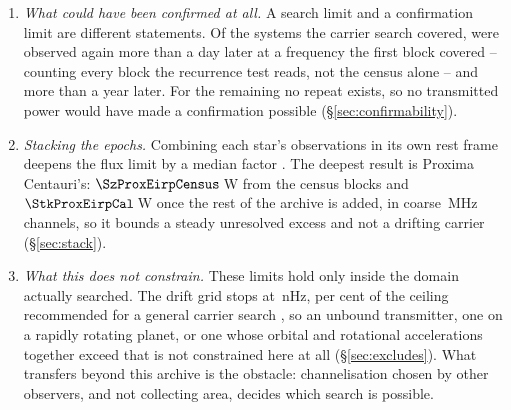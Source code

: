 \begin{enumerate}[leftmargin=1.6em,itemsep=4pt,topsep=4pt,parsep=0pt]
\item \emph{What could have been confirmed at all.} A search limit and a
confirmation limit are different statements. Of the \NSysClassA{} systems the
carrier search covered, \ZcConfSysDay{} were observed again more than a day later
at a frequency the first block covered -- counting every
block the recurrence test reads, not the census alone -- and \ZcConfSysYr{}
more than a year later. For the remaining \ZcNoRepSys{} no repeat exists, so
no transmitted power would have made a confirmation possible
(\S\ref{sec:confirmability}).

\item \emph{Stacking the epochs.} Combining each star's observations in its
own rest frame deepens the flux limit by a median factor \SyStkGainMed. The
deepest result is Proxima Centauri's: $\SzProxEirpCensus$\,W from the census
blocks and $\StkProxEirpCal$\,W once the rest of the archive is added, in
coarse \ChanBModeMHz\,MHz channels, so it bounds a steady unresolved excess
and not a drifting carrier (\S\ref{sec:stack}).

\item \emph{What this does not constrain.} These limits hold only inside the
domain actually searched. The drift grid stops at \DriftCeilLo\,nHz,
\AccelSheikhPct{} per cent of the ceiling recommended for a general carrier
search \citep{Sheikh2019}, so an unbound transmitter, one on a rapidly
rotating planet, or one whose orbital and rotational accelerations together
exceed that is not constrained here at all (\S\ref{sec:excludes}). What
transfers beyond this archive is the obstacle: channelisation chosen by other
observers, and not collecting area, decides which search is possible.

\end{enumerate}
